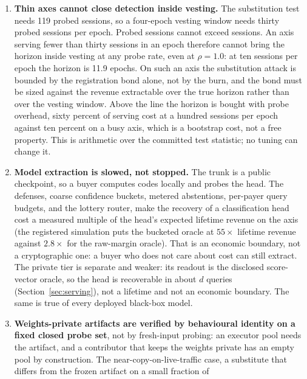 \documentclass[11pt]{article}
\begin{document}
\begin{enumerate}
    \item \textbf{Thin axes cannot close detection inside vesting.}
          The substitution test needs 119 probed sessions, so a four-epoch
          vesting window needs thirty probed sessions per epoch. Probed
          sessions cannot exceed sessions. An axis serving fewer than
          thirty sessions in an epoch therefore cannot bring the horizon
          inside vesting at any probe rate, even at $\rho=1.0$: at ten
          sessions per epoch the horizon is 11.9 epochs. On such an axis
          the substitution attack is bounded by the registration bond
          alone, not by the burn, and the bond must be sized against the
          revenue extractable over the true horizon rather than over the
          vesting window. Above the line the horizon is bought with probe
          overhead, sixty percent of serving cost at a hundred sessions
          per epoch against ten percent on a busy axis, which is a
          bootstrap cost, not a free property. This is arithmetic over the
          committed test statistic; no tuning can change it.
    \item \textbf{Model extraction is slowed, not stopped.} The trunk is a
          public checkpoint, so a buyer computes codes locally and probes
          the head. The defenses, coarse confidence buckets, metered
          abstentions, per-payer query budgets, and the lottery router,
          make the recovery of a classification head cost a measured
          multiple of the head's expected lifetime revenue on the axis
          (the registered simulation puts the bucketed oracle at $55\times$
          lifetime revenue against $2.8\times$ for the raw-margin oracle).
          That is an economic boundary, not a cryptographic
          one: a buyer who does not care about cost can still extract. The
          private tier is separate and weaker: its readout is the disclosed
          score-vector oracle, so the head is recoverable in about $d$
          queries (Section~\ref{sec:serving}), not a lifetime and not
          an economic boundary.
          The same is true of every deployed black-box model.
    \item \textbf{Weights-private artifacts are verified by behavioural
              identity on a fixed closed probe set}, not by fresh-input
          probing: an executor pool needs the artifact, and a contributor
          that keeps the weights private has an empty pool by
          construction. The near-copy-on-live-traffic case, a substitute
          that differs from the frozen artifact on a small fraction of

\end{enumerate}
\end{document}
